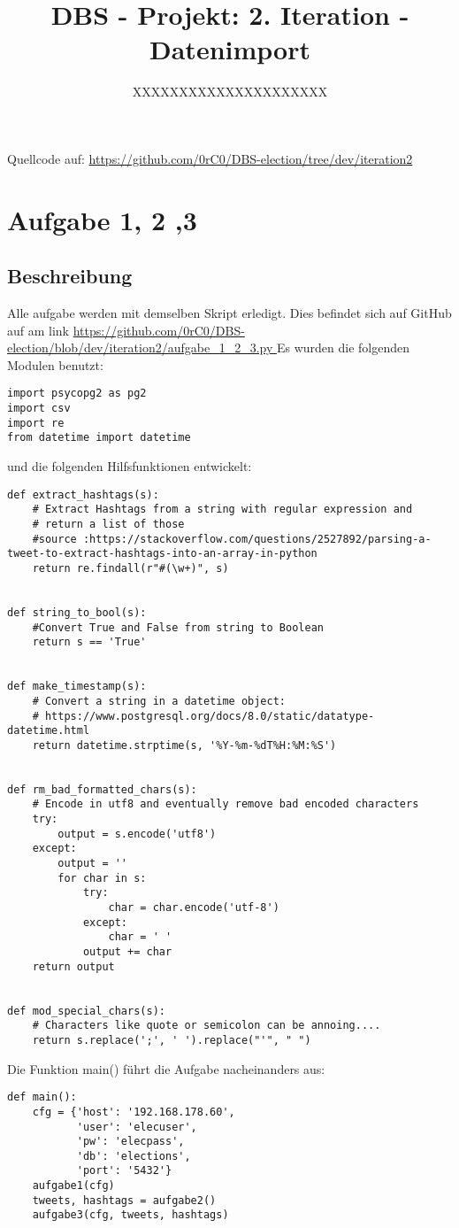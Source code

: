 \documentclass[a4paper]{article}
\title{DBS - Projekt: 2. Iteration - Datenimport}
\author{XXXXXXXXXXXXXXXXXXXXX}
\begin{document}
\maketitle

Quellcode auf: \href{https://github.com/0rC0/DBS-election/tree/dev/iteration2}{https://github.com/0rC0/DBS-election/tree/dev/iteration2}
\section{Aufgabe 1, 2 ,3}
\subsection{Beschreibung}

Alle aufgabe werden mit demselben Skript erledigt. Dies befindet sich auf GitHub auf am link \href{https://github.com/0rC0/DBS-election/blob/dev/iteration2/aufgabe_1_2_3.py}{https://github.com/0rC0/DBS-election/blob/dev/iteration2/aufgabe\_1\_2\_3.py }
Es wurden die folgenden Modulen benutzt:
\begin{verbatim}
import psycopg2 as pg2
import csv
import re
from datetime import datetime
\end{verbatim}
und die folgenden Hilfsfunktionen entwickelt:
\begin{verbatim}
def extract_hashtags(s):
    # Extract Hashtags from a string with regular expression and
    # return a list of those
    #source :https://stackoverflow.com/questions/2527892/parsing-a-tweet-to-extract-hashtags-into-an-array-in-python
    return re.findall(r"#(\w+)", s)


def string_to_bool(s):
    #Convert True and False from string to Boolean
    return s == 'True'


def make_timestamp(s):
    # Convert a string in a datetime object:
    # https://www.postgresql.org/docs/8.0/static/datatype-datetime.html
    return datetime.strptime(s, '%Y-%m-%dT%H:%M:%S')


def rm_bad_formatted_chars(s):
    # Encode in utf8 and eventually remove bad encoded characters
    try:
        output = s.encode('utf8')
    except:
        output = ''
        for char in s:
            try:
                char = char.encode('utf-8')
            except:
                char = ' '
            output += char
    return output


def mod_special_chars(s):
    # Characters like quote or semicolon can be annoing....
    return s.replace(';', ' ').replace("'", " ")
\end{verbatim}
Die Funktion main() führt die Aufgabe nacheinanders aus:
\begin{verbatim}
def main():
    cfg = {'host': '192.168.178.60',
           'user': 'elecuser',
           'pw': 'elecpass',
           'db': 'elections',
           'port': '5432'}
    aufgabe1(cfg)
    tweets, hashtags = aufgabe2()
    aufgabe3(cfg, tweets, hashtags)
\end{verbatim}
\end{document}
